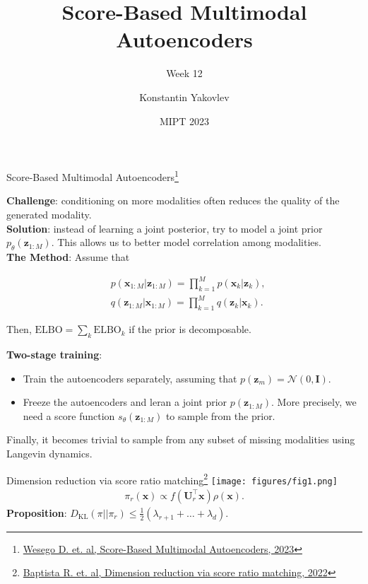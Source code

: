 \documentclass[aspectratio=169]{beamer}
\title[Week 1]
{Score-Based Multimodal Autoencoders}
\subtitle{Week 12}
\author[] %
{
Konstantin Yakovlev \inst{1} \and
}
\institute[] %
{
  \inst{1}%
  MIPT \\
  Moscow, Russia
}
\date[MIPT 2023] %
{MIPT 2023}
\begin{document}
\frame{\titlepage}


\begin{frame}{Score-Based Multimodal Autoencoders\footnote{\href{https://arxiv.org/pdf/2305.15708.pdf}{Wesego D. et. al, Score-Based Multimodal Autoencoders, 2023}}}
    \begin{minipage}{0.49\textwidth}
        \textbf{Challenge}: conditioning on more modalities often reduces the quality of the generated modality. \\
        \textbf{Solution}: instead of learning a joint posterior, try to model a joint prior $p_\theta(\mathbf{z}_{1:M})$.
        This allows us to better model correlation among modalities. \\
        \textbf{The Method}: Assume that
        \begin{small}
        \begin{align*}
            &p(\mathbf{x}_{1:M}|\mathbf{z}_{1:M}) = \prod_{k=1}^Mp(\mathbf{x}_k|\mathbf{z}_k), \\
            &q(\mathbf{z}_{1:M}|\mathbf{x}_{1:M}) = \prod_{k=1}^Mq(\mathbf{z}_k|\mathbf{x}_k).
        \end{align*}
        \end{small}
        Then, $\mathrm{ELBO} = \sum_k\mathrm{ELBO}_k$ if the prior is decomposable.
    \end{minipage}
    \begin{minipage}{0.49\textwidth}
        \textbf{Two-stage training}:
        \begin{itemize}
            \item Train the autoencoders separately, assuming that $p(\mathbf{z}_m) = \mathcal{N}(0, \mathbf{I})$.
            \item Freeze the autoencoders and leran a joint prior $p(\mathbf{z}_{1:M})$.
            More precisely, we need a score function $s_\theta(\mathbf{z}_{1:M})$ to sample from the prior.
        \end{itemize}
        Finally, it becomes trivial to sample from any subset of missing modalities using Langevin dynamics.
    \end{minipage}
\end{frame}


\begin{frame}{Dimension reduction via score ratio matching\footnote{\href{https://openreview.net/pdf?id=YAN97j2NmGT}{Baptista R. et. al, Dimension reduction via score ratio matching, 2022}}}
    \texttt{[image: figures/fig1.png]}
    \begin{align*}
        \pi_r(\mathbf{x}) \propto f(\mathbf{U}_r^\top \mathbf{x})\rho(\mathbf{x}).
    \end{align*}
    \textbf{Proposition}: $D_\text{KL}(\pi||\pi_r) \leq \frac{1}{2}(\lambda_{r + 1} + \ldots + \lambda_d)$.
\end{frame}
\end{document}
